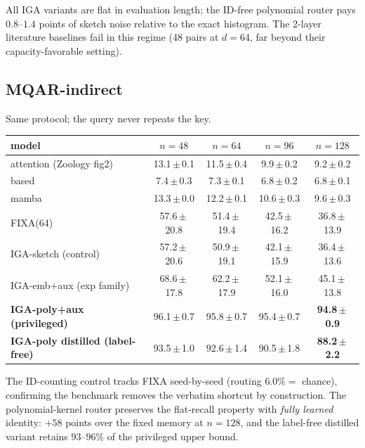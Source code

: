 \documentclass[11pt]{article}
\begin{document}
All IGA variants are flat in evaluation length; the ID-free polynomial router
pays $0.8$--$1.4$ points of sketch noise relative to the exact histogram. The
2-layer literature baselines fail in this regime (48 pairs at $d=64$, far beyond
their capacity-favorable setting).

\subsection{MQAR-indirect}

Same protocol; the query never repeats the key.

\begin{table}[h]\centering
\begin{tabular}{lcccc}
\toprule
model & $n{=}48$ & $n{=}64$ & $n{=}96$ & $n{=}128$ \\
\midrule
attention (Zoology fig2) & 13.1\,$\pm$\,0.1 & 11.5\,$\pm$\,0.4 & 9.9\,$\pm$\,0.2 & 9.2\,$\pm$\,0.2 \\
based                     & 7.4\,$\pm$\,0.3  & 7.3\,$\pm$\,0.1  & 6.8\,$\pm$\,0.2 & 6.8\,$\pm$\,0.1 \\
mamba                    & 13.3\,$\pm$\,0.0 & 12.2\,$\pm$\,0.1 & 10.6\,$\pm$\,0.3 & 9.6\,$\pm$\,0.3 \\
FIXA(64)                 & 57.6\,$\pm$\,20.8 & 51.4\,$\pm$\,19.4 & 42.5\,$\pm$\,16.2 & 36.8\,$\pm$\,13.9 \\
IGA-sketch (control)     & 57.2\,$\pm$\,20.6 & 50.9\,$\pm$\,19.1 & 42.1\,$\pm$\,15.9 & 36.4\,$\pm$\,13.6 \\
IGA-emb+aux (exp family) & 68.6\,$\pm$\,17.8 & 62.2\,$\pm$\,17.9 & 52.1\,$\pm$\,16.0 & 45.1\,$\pm$\,13.8 \\
\textbf{IGA-poly+aux (privileged)}        & 96.1\,$\pm$\,0.7 & 95.8\,$\pm$\,0.7 & 95.4\,$\pm$\,0.7 & \textbf{94.8\,$\pm$\,0.9} \\
\textbf{IGA-poly distilled (label-free)}   & 93.5\,$\pm$\,1.0 & 92.6\,$\pm$\,1.4 & 90.5\,$\pm$\,1.8 & \textbf{88.2\,$\pm$\,2.2} \\
\bottomrule
\end{tabular}
\end{table}

The ID-counting control tracks FIXA seed-by-seed (routing $6.0\%=$ chance),
confirming the benchmark removes the verbatim shortcut by construction. The
polynomial-kernel router preserves the flat-recall property with \emph{fully
learned} identity: $+58$ points over the fixed memory at $n=128$, and the
label-free distilled variant retains $93$--$96\%$ of the privileged upper bound.
\end{document}
